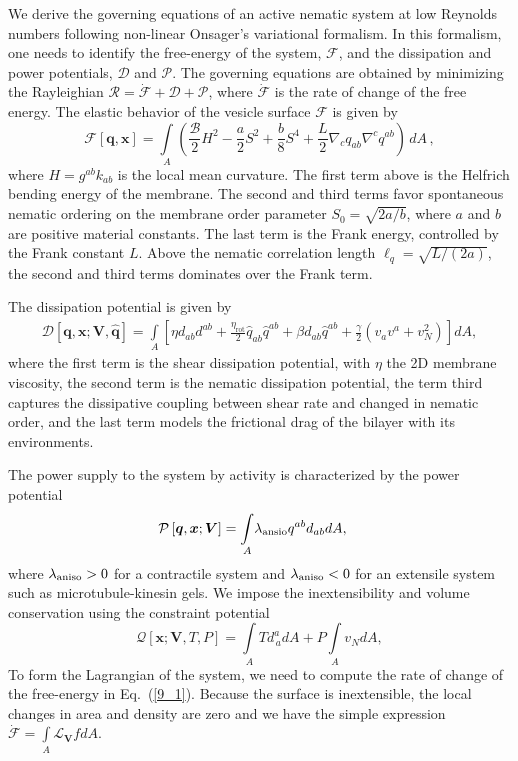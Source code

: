We derive the governing equations of an active nematic system at low Reynolds numbers following non-linear Onsager's variational formalism. In this formalism, one needs to identify the free-energy of the system, $\mathcal{F}$, and the dissipation and power potentials, $\mathcal{D}$ and $\mathcal{P}$. 
The governing equations are obtained by minimizing the Rayleighian $\mathcal{R}=\dot{\mathcal{F}}+\mathcal{D}+\mathcal{P}$, where $\dot{\mathcal{F}}$ is the rate of change of the free energy.  The elastic behavior of the vesicle surface $\mathcal{F}$ is given by
\begin{equation} \label{9_1}
   \mathcal{F}[\bm{q}, \bm{x}] =\underset{A}{\int} \left(\frac{ \mathcal{B} }{2} H^{2} - \frac{a}{2}S^{2} + \frac{b}{8} S^{4} + \frac{L}{2}\nabla_c q_{ab} \nabla^c q^{ab} \right) \,d A \, ,
\end{equation}
where $H = g^{ab}k_{ab}$ is the local mean curvature. The first term above is the Helfrich bending energy of the membrane.  The second and third terms favor spontaneous nematic ordering on the membrane order parameter $S_0 = \sqrt{2a/b}$, where $a$ and $b$ are positive material constants. The last term is the Frank energy, controlled by the Frank constant $L$. Above the nematic correlation length $\ell_q = \sqrt{L/(2a)}$, the second and third terms dominates over the Frank term.

The dissipation potential is given by 
\begin{align}  \label{9_2}
    \mathcal{D}[\bm{q}, \bm{x};  \bm{V}, \widehat{\bm{q}}]   = \underset{A}{\int} \left[  \eta  d_{ab} d^{ab}+   \frac{\eta_{\text{rot}}}{2}  \widehat{q}_{ab}\widehat{q}^{ab} +\beta  d_{ab} \widehat{q}^{ab}   +  \frac{\gamma}{2} \left(v_a v^a + v_N^2\right) \right]   dA , \end{align}
where the first term is the shear dissipation potential, with $\eta$ the 2D membrane viscosity, the second term is the nematic dissipation potential, the term third captures the dissipative coupling between shear rate and changed in nematic order, and the last term models the frictional drag of the bilayer with its environments.

The power supply to the system by activity is characterized by the power potential
 \begin{align}  \label{9_3}
  \mathcal{P} \left[\bm{q}, \bm{x};  \bm{V} \right]  &=\underset{A}{\int} \lambda_{\rm ansio}q^{ab}d_{ab} dA,
 \end{align}
where $\lambda_{\rm aniso}>0$ for a contractile system and   $\lambda_{\rm aniso}<0$ for an extensile system such as microtubule-kinesin gels. We impose the inextensibility  and volume conservation using the constraint potential \begin{equation} \label{9_4}
    \mathcal{Q}\left[\bm{x};\bm{V}, T,P \right] = \underset{A}{\int}  T d^{a}_{\,a}     d A +  P \underset{A}{\int}  v_N  d A,
\end{equation}
To form the Lagrangian of the system, we need to compute the rate of change of the free-energy in Eq.~(\ref{9_1}). Because the surface is inextensible, the local changes in area and density are zero and we have the simple expression  $\mathcal{\dot{F}} =\underset{A}{\int} \mathcal{L}_{\bm{V}} f dA$.

